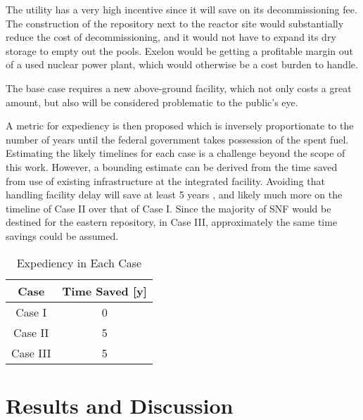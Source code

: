 The utility has a very high incentive since it will save on its decommissioning fee.
The construction of the repository next to the reactor site would substantially
reduce the cost of decommissioning, and it would not have to expand its dry storage
to empty out the pools. Exelon would be getting a profitable margin out of a
used nuclear power plant, which would otherwise be a cost burden to handle.

The base case requires a new above-ground facility, which not only costs a great
amount, but also will be considered problematic to the public's eye. 




A metric for expediency is then proposed which is inversely proportionate to 
the number of years until the federal government takes possession of the spent 
fuel. Estimating the likely timelines for each case is a challenge beyond the 
scope of this work. However, a bounding estimate can be derived from the time 
saved from use of existing infrastructure at the integrated facility. Avoiding 
that handling facility delay will save at least 5 years \cite{doe_snf_plan?}, 
and likely much more on the timeline of Case II over that of Case I. Since the 
majority of \gls{SNF} would be destined for the eastern repository, in Case 
III, approximately the same time savings could be assumed.

\begin{table}[h]
	\centering
        \caption {Expediency in Each Case}
		\begin{tabular}{|c|c|}
			\hline
                        Case & Time Saved [y] \\
			\hline
			Case I & 0 \\
			Case II & 5 \\
			Case III & 5\\ 
			\hline
                \end{tabular}
\end{table}

\section{Results and Discussion} 

